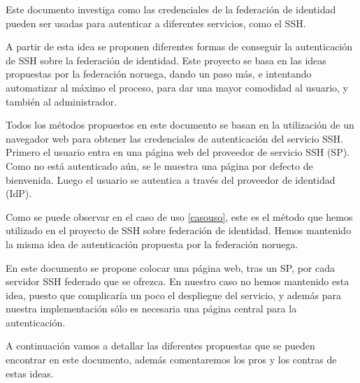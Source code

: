     Este documento investiga como las credenciales de la federación
    de identidad pueden ser usadas para autenticar a diferentes
    servicios, como el SSH.

    A partir de esta idea se proponen diferentes formas de conseguir
    la autenticación de SSH sobre la federación de identidad.
    Este proyecto se basa en las ideas propuestas por la federación
    noruega, dando un paso más, e intentando automatizar al máximo el
    proceso, para dar una mayor comodidad al usuario, y también al
    administrador.

    Todos los métodos propuestos en este documento se basan en la
    utilización de un navegador web para obtener las credenciales
    de autenticación del servicio SSH. Primero el usuario entra en
    una página web del proveedor de servicio SSH (SP). Como no está
    autenticado aún, se le muestra una página por defecto de
    bienvenida. Luego el usuario se autentica a través del
    proveedor de identidad (IdP).

    Como se puede observar en el caso de uso \ref{casouso}, este es el
    método que hemos utilizado en el proyecto de SSH sobre federación
    de identidad. Hemos mantenido la misma idea de autenticación
    propuesta por la federación noruega.

    En este documento se propone colocar una página web, tras un SP,
    por cada servidor SSH federado que se ofrezca. En nuestro caso no
    hemos mantenido esta idea, puesto que complicaría un poco el
    despliegue del servicio, y además para nuestra implementación sólo
    es necesaria una página central para la autenticación.

    A continuación vamos a detallar las diferentes propuestas que se
    pueden encontrar en este documento, además comentaremos los pros y
    los contras de estas ideas.

